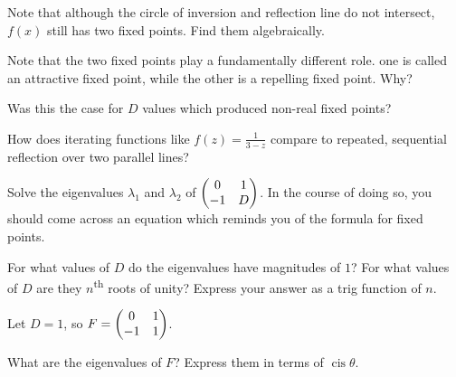 \documentclass[../gatm_answers.tex]{subfiles}
\begin{document}
\begin{inner_problem}
\item Note that although the circle of inversion and reflection line do not intersect, $f(x)$ still has two fixed points. Find them algebraically.
\end{inner_problem}

\begin{inner_problem}
\item Note that the two fixed points play a fundamentally different role. one is called an attractive fixed point, while the other is a repelling fixed point. Why?
\end{inner_problem}

\begin{inner_problem}
\item Was this the case for $D$ values which produced non-real fixed points?
\end{inner_problem}

\begin{inner_problem}
\item How does iterating functions like $f(z)=\frac{1}{3-z}$ compare to repeated, sequential reflection over two parallel lines?
\end{inner_problem}

\begin{outer_problem}
\item Solve the eigenvalues $\lambda_1$ and $\lambda_2$ of $\begin{pmatrix} 0 & 1 \\ -1 & D \end{pmatrix}$. In the course of doing so, you should come across an equation which reminds you of the formula for fixed points.
\end{outer_problem}

\begin{outer_problem}
\item For what values of $D$ do the eigenvalues have magnitudes of $1$? For what values of $D$ are they $n$\textsuperscript{th} roots of unity? Express your answer as a trig function of $n$.
\end{outer_problem}

\begin{outer_problem}
\item Let $D=1$, so $F=\begin{pmatrix} 0 & 1 \\ -1 & 1 \end{pmatrix}$.
\end{outer_problem}

\begin{inner_problem}[start=1]
\item What are the eigenvalues of $F$? Express them in terms of $\operatorname{cis} \theta$.
\end{inner_problem}
\end{document}

